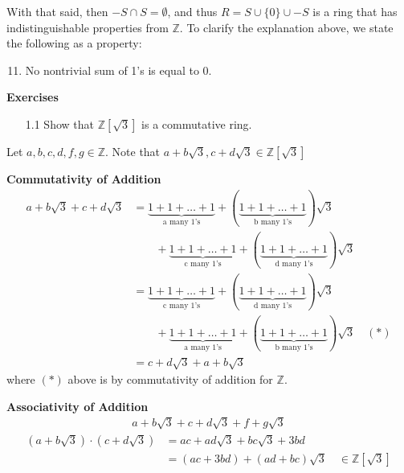 \documentclass[11pt, oneside]{book}
\theoremstyle{break}
\newcommand{\bb}[1]{\mathbb{#1}}			%
\begin{document}
With that said, then $-S \cap S = \emptyset$, and thus $R = S \cup \{0\} \cup -S$ is a ring that has indistinguishable properties from $\bb{Z}$. To clarify the explanation above, we state the following as a property:

\begin{enumerate}
	\setcounter{enumi}{10}
	\item No nontrivial sum of 1's is equal to 0.
\end{enumerate}

\textbf{Exercises}
\begin{enumerate}
	\item[1.1] Show that $\bb{Z}[\sqrt{3}]$ is a commutative ring.
\end{enumerate}

Let $a, b, c, d, f, g \in \bb{Z}$. Note that $a + b\sqrt{3}, c + d\sqrt{3} \in \bb{Z}[\sqrt{3}]$

\textbf{Commutativity of Addition}
\begin{align*}
	a + b\sqrt{3} + c + d\sqrt{3} &= \underbrace{1 + 1 + \hdots + 1}_\text{a many 1's} + (\underbrace{1 + 1 + \hdots + 1}_\text{b many 1's})\sqrt{3} \\
		& \qquad + \underbrace{1 + 1 + \hdots + 1}_\text{c many 1's} + (\underbrace{1 + 1 + \hdots + 1}_\text{d many 1's})\sqrt{3} \\
		&= \underbrace{1 + 1 + \hdots + 1}_\text{c many 1's} + (\underbrace{1 + 1 + \hdots + 1}_\text{d many 1's})\sqrt{3} \\
		& \qquad + \underbrace{1 + 1 + \hdots + 1}_\text{a many 1's} + (\underbrace{1 + 1 + \hdots + 1}_\text{b many 1's})\sqrt{3} \quad (*) \\
		&= c + d\sqrt{3} + a + b\sqrt{3}
\end{align*}
where $(*)$ above is by commutativity of addition for $\bb{Z}$.

\textbf{Associativity of Addition}
\begin{align*}
	a + b\sqrt{3} + c + d\sqrt{3} + f + g\sqrt{3}
\end{align*}
\begin{align*}
	(a + b\sqrt{3}) \cdot (c + d\sqrt{3}) &= ac + ad\sqrt{3} + bc\sqrt{3} + 3bd \\
										  &= (ac + 3bd) + (ad + bc)\sqrt{3} \quad \in \bb{Z}[\sqrt{3}]
\end{align*}
\end{document}
